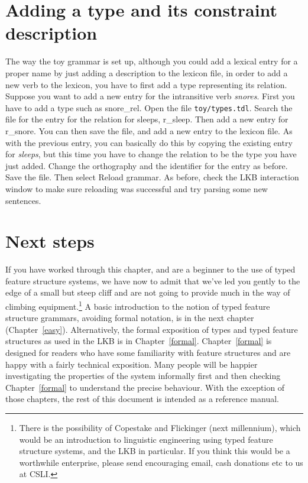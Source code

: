 \documentclass[12pt]{report}
\newcommand{\filename}[1]{{\tt #1}}
\newcommand{\lkbmenucommand}{{\bf}}
\begin{document}
\section{Adding a type and its constraint description}

The way the toy grammar is set up, although you could add a lexical
entry for a proper name by just adding a description to the lexicon file,
in order to add a new verb to the lexicon, you have to first add a type
representing its relation.  Suppose you want to add a new entry for
the intransitive verb {\it snores}.  First you have to add a type such as
{\type snore\_rel}.  Open the file \filename{toy/types.tdl}.  Search the file for
the entry for the relation for sleeps, {\type r\_sleep}.  Then add a new
entry for {\type r\_snore}.  You can then save the file, and add a new entry
to the lexicon file.  As with the previous entry, you can basically do
this by copying the existing entry for {\it sleeps},
but this time you have to 
change the relation to be the type you have just added.
Change the orthography and the identifier for the entry as before.
Save the file.  Then select {\lkbmenucommand Reload grammar}.  As before, check
the LKB interaction window to make sure reloading was successful 
and try parsing
some new sentences.


\section{Next steps}

If you have worked through this chapter, and are a beginner to the use of typed
feature structure systems, we have now to admit that we've led you gently to
the edge of a small but steep cliff and are not going to provide much in the
way of climbing equipment.\footnote{There is the possibility of Copestake and
Flickinger (next millennium), which would be an introduction to linguistic
engineering using typed feature structure systems, and the LKB in particular.
If you think this would be a worthwhile enterprise, please send encouraging
email, cash donations etc to us at CSLI.}  
A basic introduction to the notion of typed feature structure
grammars, avoiding formal notation,
is in the next chapter (Chapter~\ref{easy}).
Alternatively, the 
formal exposition of types and typed feature structures as used in the LKB
is in Chapter~\ref{formal}.  
Chapter~\ref{formal} is designed for readers who have some familiarity
with feature structures and are happy with a fairly technical exposition.  
Many people will be happier investigating the properties of the
system informally first and then checking Chapter~\ref{formal} 
to understand the precise behaviour.  With
the exception of those chapters, the rest of this document is intended as a
reference manual.  
\end{document}
